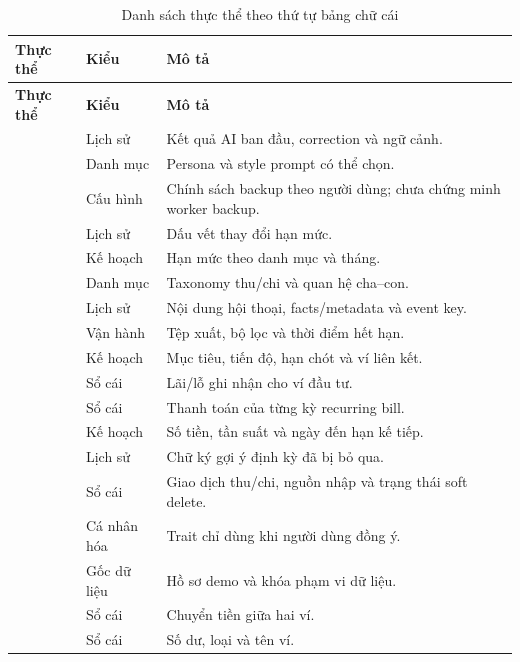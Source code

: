 \begin{longtable}{@{}L{4.5cm}L{3.0cm}L{6.0cm}@{}}
  \caption{Danh sách thực thể theo thứ tự bảng chữ cái}\label{tab:data-entities}\\
  \toprule
  \textbf{Thực thể} & \textbf{Kiểu} & \textbf{Mô tả} \\
  \midrule
  \endfirsthead
  \toprule
  \textbf{Thực thể} & \textbf{Kiểu} & \textbf{Mô tả} \\
  \midrule
  \endhead
   & Lịch sử & Kết quả AI ban đầu, correction và ngữ cảnh. \\
   & Danh mục & Persona và style prompt có thể chọn. \\
   & Cấu hình & Chính sách backup theo người dùng; chưa chứng minh worker backup. \\
   & Lịch sử & Dấu vết thay đổi hạn mức. \\
   & Kế hoạch & Hạn mức theo danh mục và tháng. \\
   & Danh mục & Taxonomy thu/chi và quan hệ cha--con. \\
   & Lịch sử & Nội dung hội thoại, facts/metadata và event key. \\
   & Vận hành & Tệp xuất, bộ lọc và thời điểm hết hạn. \\
   & Kế hoạch & Mục tiêu, tiến độ, hạn chót và ví liên kết. \\
   & Sổ cái & Lãi/lỗ ghi nhận cho ví đầu tư. \\
   & Sổ cái & Thanh toán của từng kỳ recurring bill. \\
   & Kế hoạch & Số tiền, tần suất và ngày đến hạn kế tiếp. \\
   & Lịch sử & Chữ ký gợi ý định kỳ đã bị bỏ qua. \\
   & Sổ cái & Giao dịch thu/chi, nguồn nhập và trạng thái soft delete. \\
   & Cá nhân hóa & Trait chỉ dùng khi người dùng đồng ý. \\
   & Gốc dữ liệu & Hồ sơ demo và khóa phạm vi dữ liệu. \\
   & Sổ cái & Chuyển tiền giữa hai ví. \\
   & Sổ cái & Số dư, loại và tên ví. \\
  \bottomrule
\end{longtable}

